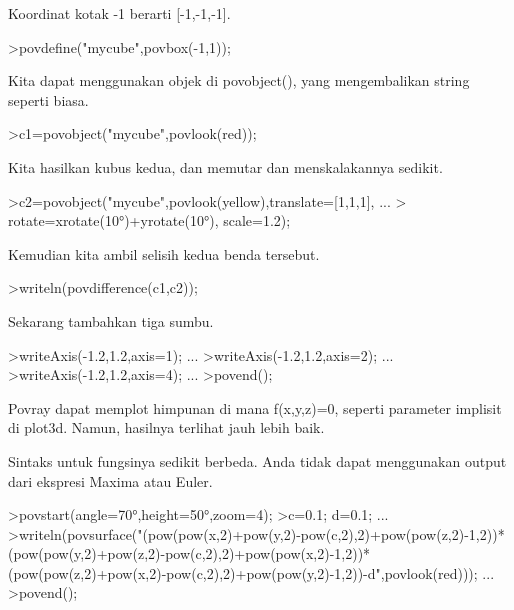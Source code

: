 \documentclass{article}
\begin{document}
\begin{eulernotebook}
\begin{eulercomment}
\begin{eulercomment}
\begin{eulercomment}
Koordinat kotak -1 berarti [-1,-1,-1].
\end{eulercomment}
\begin{eulerprompt}
>povdefine("mycube",povbox(-1,1));
\end{eulerprompt}
\begin{eulercomment}
Kita dapat menggunakan objek di povobject(), yang mengembalikan string
seperti biasa.
\end{eulercomment}
\begin{eulerprompt}
>c1=povobject("mycube",povlook(red));
\end{eulerprompt}
\begin{eulercomment}
Kita hasilkan kubus kedua, dan memutar dan menskalakannya sedikit.
\end{eulercomment}
\begin{eulerprompt}
>c2=povobject("mycube",povlook(yellow),translate=[1,1,1], ...
>  rotate=xrotate(10°)+yrotate(10°), scale=1.2);
\end{eulerprompt}
\begin{eulercomment}
Kemudian kita ambil selisih kedua benda tersebut.
\end{eulercomment}
\begin{eulerprompt}
>writeln(povdifference(c1,c2));
\end{eulerprompt}
\begin{eulercomment}
Sekarang tambahkan tiga sumbu.
\end{eulercomment}
\begin{eulerprompt}
>writeAxis(-1.2,1.2,axis=1); ...
>writeAxis(-1.2,1.2,axis=2); ...
>writeAxis(-1.2,1.2,axis=4); ...
>povend();
\end{eulerprompt}
\begin{eulercomment}
Povray dapat memplot himpunan di mana f(x,y,z)=0, seperti parameter
implisit di plot3d. Namun, hasilnya terlihat jauh lebih baik.

Sintaks untuk fungsinya sedikit berbeda. Anda tidak dapat menggunakan
output dari ekspresi Maxima atau Euler.
\end{eulercomment}
\begin{eulerprompt}
>povstart(angle=70°,height=50°,zoom=4);
>c=0.1; d=0.1; ...
>writeln(povsurface("(pow(pow(x,2)+pow(y,2)-pow(c,2),2)+pow(pow(z,2)-1,2))*(pow(pow(y,2)+pow(z,2)-pow(c,2),2)+pow(pow(x,2)-1,2))*(pow(pow(z,2)+pow(x,2)-pow(c,2),2)+pow(pow(y,2)-1,2))-d",povlook(red))); ...
>povend();
\end{eulerprompt}
\begin{euleroutput}
  

\end{euleroutput}
\end{eulercomment}
\end{eulercomment}
\end{eulernotebook}
\end{document}
